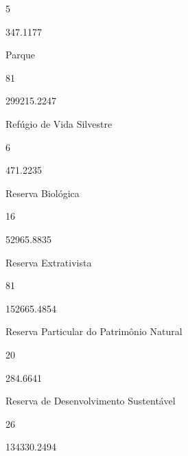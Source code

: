 \documentclass[
  letterpaper,
]{report}
\begin{document}
5

\n      

347.1177

\n    

\n    

\n      

Parque

\n      

81

\n      

299215.2247

\n    

\n    

\n      

Refúgio de Vida Silvestre

\n      

6

\n      

471.2235

\n    

\n    

\n      

Reserva Biológica

\n      

16

\n      

52965.8835

\n    

\n    

\n      

Reserva Extrativista

\n      

81

\n      

152665.4854

\n    

\n    

\n      

Reserva Particular do Patrimônio Natural

\n      

20

\n      

284.6641

\n    

\n    

\n      

Reserva de Desenvolvimento Sustentável

\n      

26

\n      

134330.2494

\n    
\end{document}
